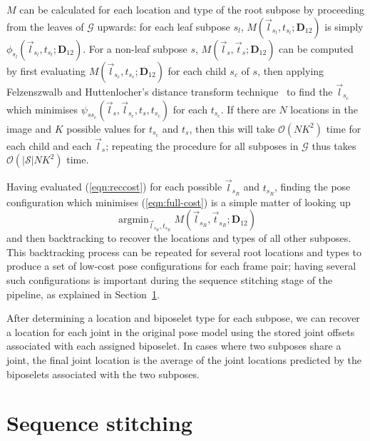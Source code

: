 \documentclass[runningheads]{llncs}
\newcommand{\mat}{\mathbf}
\DeclareMathOperator{\argmin}{arg min}
\begin{document}
$M$ can be calculated for each location and type of the root subpose by
proceeding from the leaves of $\mathcal G$ upwards: for each leaf subpose $s_l$,
$M(\vec l_{s_l}, t_{s_l}; \mat D_{12})$ is simply $\phi_{s_l}(\vec l_{s_l},
t_{s_l}; \mat D_{12})$. For a non-leaf subpose $s$, $M(\vec l_s, \vec t_s; \mat
D_{12})$ can be computed by first evaluating $M(\vec l_{s_c}, t_{s_c}; \mat
D_{12})$ for each child $s_c$ of $s$, then applying Felzenszwalb and
Huttenlocher's distance transform technique~\cite{felzenszwalb2012distance} to
find the $\vec l_{s_c}$ which minimises $\psi_{s s_c}(\vec l_s, \vec l_{s_c},
t_s, t_{s_c})$ for each $t_{s_c}$. If there are $N$ locations in the image and
$K$ possible values for $t_{s_c}$ and $t_s$, then this will take $\mathcal O(N
K^2)$ time for each child and each $\vec l_s$; repeating the procedure for all
subposes in $\mathcal G$ thus takes $\mathcal O(|\mathcal S| N K^2)$ time.

Having evaluated (\ref{eqn:reccost}) for each possible $\vec l_{s_R}$ and
$t_{s_R}$, finding the pose configuration which minimises (\ref{eqn:full-cost})
is a simple matter of looking up
%
\begin{equation}
\argmin_{\vec l_{s_R}, t_{s_R}} M(\vec l_{s_R}, \vec t_{s_R}; \mat D_{12})
\end{equation}
%
and then backtracking to recover the locations and types of all other subposes.
This backtracking process can be repeated for several root locations and types
to produce a set of low-cost pose configurations for each frame pair; having
several such configurations is important during the sequence stitching stage of
the pipeline, as explained in Section~\ref{sec:stitching}.

After determining a location and biposelet type for each subpose, we can recover
a location for each joint in the original pose model using the stored joint
offsets associated with each assigned biposelet. In cases where two subposes
share a joint, the final joint location is the average of the joint locations
predicted by the biposelets associated with the two subposes.

\section{Sequence stitching}\label{sec:stitching}

\end{document}
